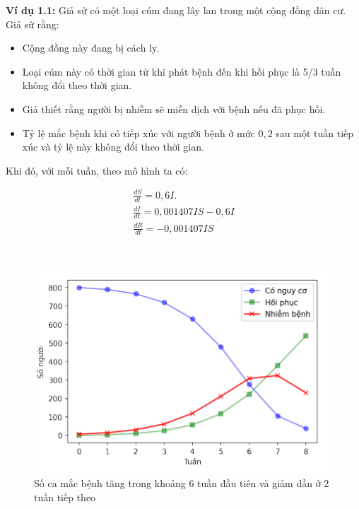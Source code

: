 \documentclass[a4paper]{article}
\begin{document}
\textbf{Ví dụ 1.1:} Giả sử có một loại cúm đang lây lan trong một cộng đồng dân cư. Giả sử rằng:
\begin{itemize}
    \item Cộng đồng này đang bị cách ly.
    \item Loại cúm này có thời gian từ khi phát bệnh đến khi hồi phục là 5/3 tuần không đổi theo thời gian.
    \item  Giả thiết rằng người bị nhiễm sẽ miễn dịch với bệnh nếu đã phục hồi.
    \item Tỷ lệ mắc bệnh khi có tiếp xúc với người bệnh ở mức $0,2$ sau một tuần tiếp xúc và tỷ lệ này không đổi theo thời gian.
\end{itemize}
Khi đó, với mỗi tuần, theo mô hình ta có:

\begin{align}
    \frac{dS}{dt} = 0,6I.\\
    \frac{dI}{dt} = 0,001407IS - 0,6I\\
    \frac{dR}{dt} = -0,001407IS
\end{align}







\\
 \begin{figure}[!ht] 
    \label{Fig:Frequency}
	\begin{center}
	\includegraphics[scale=1.2]{Images/img1.1.png}
	\caption{Số ca mắc bệnh tăng trong khoảng 6 tuần đầu tiên và giảm dần ở 2 tuần tiếp theo }
	\end{center}
\end{figure}

\end{document}

